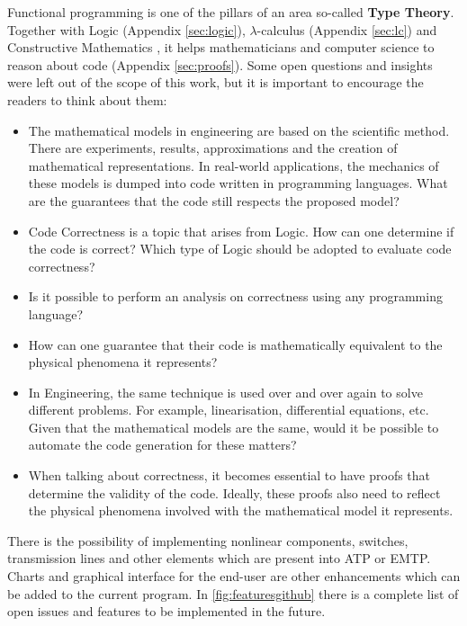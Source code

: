 Functional programming is one of the pillars of an area so-called \textbf{Type Theory}. Together with Logic (Appendix \ref{sec:logic}), $\lambda$-calculus (Appendix \ref{sec:lc}) and Constructive Mathematics \cite{thompson1991type}, it helps mathematicians and computer science to reason about code (Appendix \ref{sec:proofs}). Some open questions and insights were left out of the scope of this work, but it is important to encourage the readers to think about them:

\begin{itemize}
  \item The mathematical models in engineering are based on the scientific method. There are experiments, results, approximations and the creation of mathematical representations. In real-world applications, the mechanics of these models is dumped into code written in programming languages. What are the guarantees that the code still respects the proposed model?
  \item Code Correctness is a topic that arises from Logic. How can one determine if the code is correct? Which type of Logic should be adopted to evaluate code correctness? 
  \item Is it possible to perform an analysis on correctness using any programming language? 
  \item How can one guarantee that their code is mathematically equivalent to the physical phenomena it represents? 
  \item In Engineering, the same technique is used over and over again to solve different problems. For example, linearisation, differential equations, etc. Given that the mathematical models are the same, would it be possible to automate the code generation for these matters?
  \item When talking about correctness, it becomes essential to have proofs that determine the validity of the code. Ideally, these proofs also need to reflect the physical phenomena involved with the mathematical model it represents.
\end{itemize}

There is the possibility of implementing nonlinear components, switches, transmission lines and other elements which are present into ATP or EMTP. Charts and graphical interface for the end-user are other enhancements which can be added to the current program. In \cref{fig:featuresgithub} there is a complete list of open issues and features to be implemented in the future.


